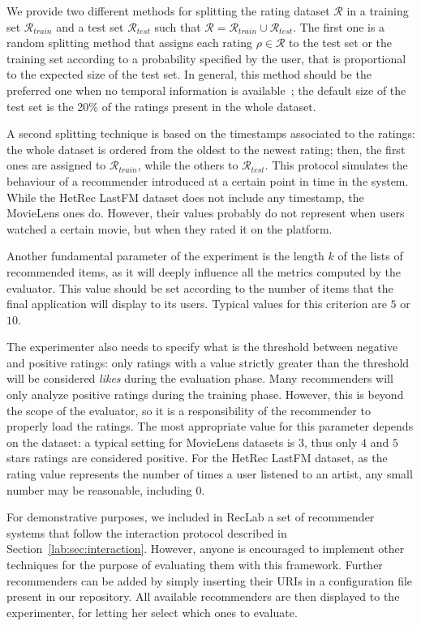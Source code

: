 We provide two different methods for splitting the rating dataset $\mathcal{R}$ in a training set $\mathcal{R}_{train}$ and a test set $\mathcal{R}_{test}$ such that $\mathcal{R} = \mathcal{R}_{train} \cup \mathcal{R}_{test}$. The first one is a random splitting method that assigns each rating $\rho \in \mathcal{R}$ to the test set or the training set according to a probability specified by the user, that is proportional to the expected size of the test set. In general, this method should be the preferred one when no temporal information is available~\cite{Gunawardana2015}; the default size of the test set is the 20\% of the ratings present in the whole dataset.

A second splitting technique is based on the timestamps associated to the ratings: the whole dataset is ordered from the oldest to the newest rating; then, the first ones are assigned to $\mathcal{R}_{train}$, while the others to $\mathcal{R}_{test}$. This protocol simulates the behaviour of a recommender introduced at a certain point in time in the system. While the HetRec LastFM dataset does not include any timestamp, the MovieLens ones do. However, their values probably do not represent when users watched a certain movie, but when they rated it on the platform.

Another fundamental parameter of the experiment is the length $k$ of the lists of recommended items, as it will deeply influence all the metrics computed by the evaluator. This value should be set according to the number of items that the final application will display to its users. Typical values for this criterion are $5$ or $10$.

The experimenter also needs to specify what is the threshold between negative and positive ratings: only ratings with a value strictly greater than the threshold will be considered \emph{likes} during the evaluation phase. Many recommenders will only analyze positive ratings during the training phase. However, this is beyond the scope of the evaluator, so it is a responsibility of the recommender to properly load the ratings. The most appropriate value for this parameter depends on the dataset: a typical setting for MovieLens datasets is $3$, thus only $4$ and $5$ stars ratings are considered positive. For the HetRec LastFM dataset, as the rating value represents the number of times a user listened to an artist, any small number may be reasonable, including $0$.

For demonstrative purposes, we included in RecLab a set of recommender systems that follow the interaction protocol described in Section~\ref{lab:sec:interaction}. However, anyone is encouraged to implement other techniques for the purpose of evaluating them with this framework. Further recommenders can be added by simply inserting their URIs in a configuration file present in our repository. All available recommenders are then displayed to the experimenter, for letting her select which ones to evaluate.

